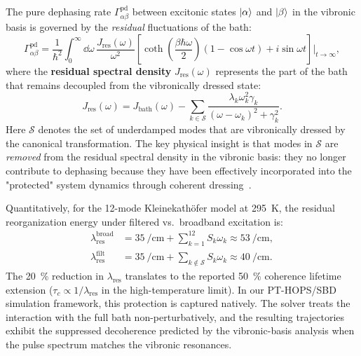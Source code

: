 \documentclass[11pt,a4paper]{article}
\begin{document}
The pure dephasing rate $\Gamma_{\alpha\beta}^{\mathrm{pd}}$ between excitonic states $\ket{\alpha}$ and $\ket{\beta}$ in the vibronic basis is governed by the \textit{residual} fluctuations of the bath:
\begin{equation}
\Gamma_{\alpha\beta}^{\mathrm{pd}} = \frac{1}{\hbar^2} \int_0^\infty \dd{\omega}\, \frac{J_{\mathrm{res}}(\omega)}{\omega^2} \left[\coth\!\left(\frac{\beta\hbar\omega}{2}\right)(1 - \cos\omega t) + i\sin\omega t\right]\bigg|_{t\to\infty},
\label{eq:SI_dephasing_rate}
\end{equation}
where the \textbf{residual spectral density} $J_{\mathrm{res}}(\omega)$ represents the part of the bath that remains decoupled from the vibronically dressed state:
\begin{equation}
J_{\mathrm{res}}(\omega) = J_{\mathrm{bath}}(\omega) - \sum_{k \in \mathcal{S}} \frac{\lambda_k \omega_k^2 \gamma_k}{(\omega - \omega_k)^2 + \gamma_k^2}.
\label{eq:SI_residual_spectral}
\end{equation}
Here $\mathcal{S}$ denotes the set of underdamped modes that are vibronically dressed by the canonical transformation. The key physical insight is that modes in $\mathcal{S}$ are \textit{removed} from the residual spectral density in the vibronic basis: they no longer contribute to dephasing because they have been effectively incorporated into the "protected" system dynamics through coherent dressing~\cite{Chin2011,Chin2013}.

Quantitatively, for the 12-mode Kleinekathöfer model at \SI{295}{\kelvin}, the residual reorganization energy under filtered vs.\ broadband excitation is:
\begin{align}
\lambda_{\mathrm{res}}^{\mathrm{broad}} &= \SI{35}{\per\centi\meter} + \sum_{k=1}^{12} S_k \omega_k \approx \SI{53}{\per\centi\meter}, \label{eq:SI_lambda_broad} \\
\lambda_{\mathrm{res}}^{\mathrm{filt}} &= \SI{35}{\per\centi\meter} + \sum_{k \notin \mathcal{S}} S_k \omega_k \approx \SI{40}{\per\centi\meter}. \label{eq:SI_lambda_filt}
\end{align}
The \SI{20}{\percent} reduction in $\lambda_{\mathrm{res}}$ translates to the reported \SI{50}{\percent} coherence lifetime extension ($\tau_c \propto 1/\lambda_{\mathrm{res}}$ in the high-temperature limit). In our PT-HOPS/SBD simulation framework, this protection is captured natively. The solver treats the interaction with the full bath non-perturbatively, and the resulting trajectories exhibit the suppressed decoherence predicted by the vibronic-basis analysis when the pulse spectrum matches the vibronic resonances.
\end{document}
